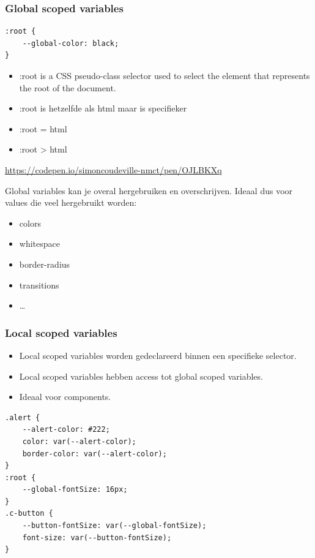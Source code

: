 \documentclass{article}
\begin{document}
\subsubsection{Global scoped variables}

\begin{verbatim}
:root {
    --global-color: black;
}
\end{verbatim}
\begin{itemize}
    \item :root is a CSS pseudo-class selector used to select the element that represents the root of the document.
    \item :root is hetzelfde als html maar is specifieker
    \item :root = html
    \item :root > html
\end{itemize}

\url{https://codepen.io/simoncoudeville-nmct/pen/OJLBKXq}

Global variables kan je overal hergebruiken en overschrijven. Ideaal dus voor values die veel hergebruikt worden:

\begin{itemize}
    \item colors
    \item whitespace
    \item border-radius
    \item transitions
    \item \dots
\end{itemize}

\subsubsection{Local scoped variables}
\begin{itemize}
    \item Local scoped variables worden gedeclareerd binnen een specifieke selector.
    \item Local scoped variables hebben access tot global scoped variables.
    \item Ideaal voor components.
\end{itemize}

\begin{verbatim}
.alert {
    --alert-color: #222;
    color: var(--alert-color);
    border-color: var(--alert-color);
}
:root {
    --global-fontSize: 16px;
}
.c-button {
    --button-fontSize: var(--global-fontSize);
    font-size: var(--button-fontSize);
}
\end{verbatim}
\end{document}
